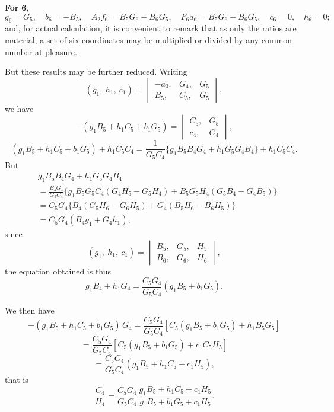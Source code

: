 \documentclass[11pt,a4paper]{article}
\begin{document}
\textbf{For} $\mathbf{6}$,
\[
g_{6} = G_{5},\quad b_{6} = -B_{5},\quad A_{2}f_{6} = B_{5}G_{6} - B_{6}G_{5},\quad F_{6}a_{6} = B_{5}G_{6} - B_{6}G_{5},\quad c_{6} = 0,\quad h_{6} = 0;
\]
and, for actual calculation, it is convenient to remark that as only the ratios are material, a set of six coordinates may be multiplied or divided by any common number at pleasure.

But these results may be further reduced. Writing
\[
(g_{1},\ h_{1},\ c_{1}) = \begin{vmatrix} -a_{3}, & G_{4}, & G_{5}\\ B_{5}, & C_{5}, & G_{5}\end{vmatrix},
\]
we have
\[
-(g_{1}B_{5}+h_{1}C_{5}+b_{1}G_{5}) = \begin{vmatrix} C_{5}, & G_{5}\\ c_{4}, & G_{4}\end{vmatrix},
\]
\[
(g_{1}B_{5}+h_{1}C_{5}+b_{1}G_{5}) + h_{1}C_{5}C_{4} = \frac{1}{G_{5}C_{4}}\{g_{1}B_{5}B_{4}G_{4}+h_{1}G_{5}G_{4}B_{4}\} + h_{1}C_{5}C_{4}.
\]
But
\begin{align*}
&g_{1}B_{5}B_{4}G_{4} + h_{1}G_{5}G_{4}B_{4}\\
&= \frac{B_{4}G_{4}}{G_{5}C_{4}}\{g_{1}B_{5}G_{5}C_{4}(G_{4}H_{5}-G_{5}H_{4}) + B_{5}G_{5}H_{4}(G_{5}B_{4}-G_{4}B_{5})\}\\
&= C_{5}G_{4}\{B_{4}(G_{5}H_{6}-G_{6}H_{5}) + G_{4}(B_{5}H_{6}-B_{6}H_{5})\}\\
&= C_{5}G_{4}(B_{4}g_{1}+G_{4}h_{1}),
\end{align*}
since
\[
(g_{1},\ h_{1},\ c_{1}) = \begin{vmatrix} B_{5}, & G_{5}, & H_{5}\\ B_{6}, & G_{6}, & H_{6}\end{vmatrix},
\]
the equation obtained is thus
\[
g_{1}B_{4} + h_{1}G_{4} = \frac{C_{5}G_{4}}{G_{5}C_{4}}(g_{1}B_{5}+b_{1}G_{5}).
\]

We then have
\[
-(g_{1}B_{5}+h_{1}C_{5}+b_{1}G_{5})\, G_{4} = \frac{C_{5}G_{4}}{G_{5}C_{4}}[C_{5}(g_{1}B_{5}+b_{1}G_{5}) + h_{1}B_{5}G_{5}]
\]
\[
= \frac{C_{5}G_{4}}{G_{5}C_{4}}[C_{5}(g_{1}B_{5}+b_{1}G_{5}) + c_{1}C_{5}H_{5}]
\]
\[
= \frac{C_{5}G_{4}}{G_{5}C_{4}}(g_{1}B_{5}+h_{1}C_{5}+c_{1}H_{5}),
\]
that is
\[
\frac{C_{4}}{H_{4}} = \frac{C_{5}G_{4}}{G_{5}C_{4}}\, \frac{g_{1}B_{5}+h_{1}C_{5}+c_{1}H_{5}}{g_{1}B_{5}+b_{1}G_{5}+c_{1}H_{5}}.
\]

\newpage
\setcounter{page}{323}
\end{document}

